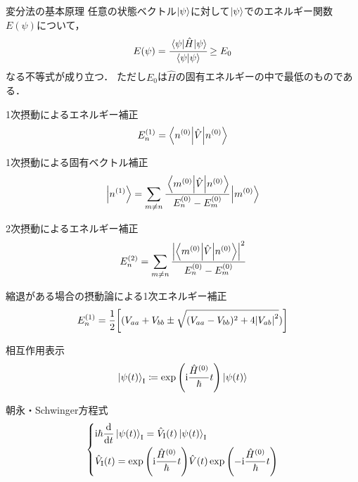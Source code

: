 \documentclass{report}
\begin{document}
\begin{itembox}[l]{変分法の基本原理}
  任意の状態ベクトル$\ket{\psi}$に対して$\ket{\psi}$でのエネルギー関数$E(\psi)$について，
  \begin{align}
    E(\psi) = \cfrac{\mel{\psi}{\hat{H}}{\psi}}{\braket{\psi}} \geq E_0 \label{minimum}
  \end{align}
  なる不等式が成り立つ．
  ただし$E_0$は$\hat{H}$の固有エネルギーの中で最低のものである．
\end{itembox}

\begin{itembox}[l]{1次摂動によるエネルギー補正}
  \begin{align}
    E_n^{(1)} = \ev**{\hat{V}}{n^{(0)}}
  \end{align}
\end{itembox}

\begin{itembox}[l]{1次摂動による固有ベクトル補正}
  \begin{align}
    \ket{n^{(1)}} = \sum_{m\neq n}\cfrac{\mel**{m^{(0)}}{\hat{V}}{n^{(0)}}}{E_n^{(0)} - E_m^{(0)}}\ket{m^{(0)}}
  \end{align}
\end{itembox}

\begin{itembox}[l]{2次摂動によるエネルギー補正}
  \begin{align}
    E_n^{(2)} = \sum_{m\neq n}\cfrac{\abs{\mel**{m^{(0)}}{\hat{V}}{n^{(0)}}}^2}{E_n^{(0)} - E_m^{(0)}}
  \end{align}
\end{itembox}

\begin{itembox}[l]{縮退がある場合の摂動論による1次エネルギー補正}
  \begin{align}
    E_n^{(1)} = \frac{1}{2}\qty[(V_{aa} + V_{bb}\pm\sqrt{(V_{aa} - V_{bb})^2 + 4\abs{V_{ab}}^2})]
  \end{align}
\end{itembox}

\begin{itembox}[l]{相互作用表示}
  \begin{align}
    \ket{\psi(t)}_{\mathrm{I}} \coloneqq \exp\qty(\mathrm{i}\frac{\hat{H}^{(0)}}{\hbar}t)\ket{\psi(t)}
  \end{align}
\end{itembox}

\begin{itembox}[l]{朝永・Schwinger方程式}
  \begin{align}
    \begin{dcases}
      \mathrm{i}\hbar\dv{t}\ket{\psi(t)}_{\mathrm{I}} = \hat{V}_{\mathrm{I}}(t)\ket{\psi(t)}_{\mathrm{I}} \\
      \hat{V}_{\mathrm{I}}(t) = \exp\qty(\mathrm{i}\frac{\hat{H}^{(0)}}{\hbar}t)\hat{V}(t)\exp\qty(-\mathrm{i}\frac{\hat{H}^{(0)}}{\hbar}t)
    \end{dcases}
  \end{align}
\end{itembox}
\end{document}

